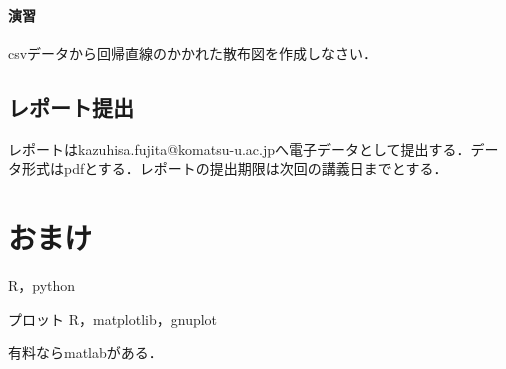\paragraph{演習}

csvデータから回帰直線のかかれた散布図を作成しなさい．

\subsection{レポート提出}

レポートはkazuhisa.fujita@komatsu-u.ac.jpへ電子データとして提出する．データ形式はpdfとする．レポートの提出期限は次回の講義日までとする．

\section{おまけ}

R，python

プロット
R，matplotlib，gnuplot


有料ならmatlabがある．
